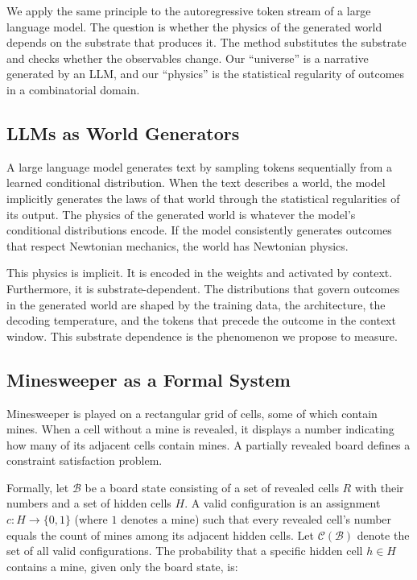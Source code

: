 \documentclass[12pt,a4paper]{article}
\begin{document}
We apply the same principle to the autoregressive token stream of a large language model. The question is whether the physics of the generated world depends on the substrate that produces it. The method substitutes the substrate and checks whether the observables change. Our ``universe'' is a narrative generated by an LLM, and our ``physics'' is the statistical regularity of outcomes in a combinatorial domain.

\subsection{LLMs as World Generators}
\label{sec:llm_worlds}

A large language model generates text by sampling tokens sequentially from a learned conditional distribution. When the text describes a world, the model implicitly generates the laws of that world through the statistical regularities of its output. The physics of the generated world is whatever the model's conditional distributions encode. If the model consistently generates outcomes that respect Newtonian mechanics, the world has Newtonian physics.

This physics is implicit. It is encoded in the weights and activated by context. Furthermore, it is substrate-dependent. The distributions that govern outcomes in the generated world are shaped by the training data, the architecture, the decoding temperature, and the tokens that precede the outcome in the context window. This substrate dependence is the phenomenon we propose to measure.

\subsection{Minesweeper as a Formal System}
\label{sec:minesweeper_formal}

Minesweeper is played on a rectangular grid of cells, some of which contain mines. When a cell without a mine is revealed, it displays a number indicating how many of its adjacent cells contain mines. A partially revealed board defines a constraint satisfaction problem.

Formally, let $\mathcal{B}$ be a board state consisting of a set of revealed cells $R$ with their numbers and a set of hidden cells $H$. A valid configuration is an assignment $c: H \to \{0, 1\}$ (where $1$ denotes a mine) such that every revealed cell's number equals the count of mines among its adjacent hidden cells. Let $\mathcal{C}(\mathcal{B})$ denote the set of all valid configurations. The probability that a specific hidden cell $h \in H$ contains a mine, given only the board state, is:
\end{document}
